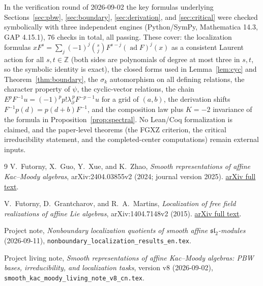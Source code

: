 \documentclass[11pt,a4paper]{article}
\newcommand{\Z}{\mathbb Z}
\newcommand{\ad}{\operatorname{ad}}
\theoremstyle{plainupright}
\begin{document}
In the verification round of 2026-09-02 the key formulas underlying
Sections~\ref{sec:pbw}, \ref{sec:boundary}, \ref{sec:derivation}, and
\ref{sec:critical} were checked symbolically with three independent engines
(Python/SymPy, Mathematica 14.3, GAP 4.15.1), 76 checks in total, all
passing. These cover: the localization formulas \(xF^s=\sum_j(-1)^j\binom{s}{j}F^{s-j}(\ad F)^j(x)\)
as a consistent Laurent action for all \(s,t\in\Z\) (both sides are
polynomials of degree at most three in \(s,t\), so the symbolic identity is
exact), the closed forms used in Lemma~\ref{lem:cyc} and
Theorem~\ref{thm:boundary}, the \(\sigma_k\) automorphism on all defining
relations, the character property of \(\psi\), the cyclic-vector relations,
the chain \(E^pF^{-1}u=(-1)^pp!\lambda_\partial^{\,p}F^{-p-1}u\) for a grid
of \((a,b)\), the derivation shifts \(F^{-1}p(d)=p(d+b)F^{-1}\), and the
composition law plus \(K=-2\) invariance of the formula in
Proposition~\ref{prop:spectral}. No Lean/Coq formalization is claimed, and
the paper-level theorems (the FGXZ criterion, the critical irreducibility
statement, and the completed-center computations) remain external inputs.

\begingroup
\raggedright
\begin{thebibliography}{9}
V.~Futorny, X.~Guo, Y.~Xue, and K.~Zhao,
\emph{Smooth representations of affine Kac--Moody algebras},
arXiv:2404.03855v2 (2024; journal version 2025).
\href{https://arxiv.org/html/2404.03855v2}{arXiv full text}.

V.~Futorny, D.~Grantcharov, and R.~A.~Martins,
\emph{Localization of free field realizations of affine Lie algebras},
arXiv:1404.7148v2 (2015).
\href{https://arxiv.org/html/1404.7148v2}{arXiv full text}.

Project note, \emph{Nonboundary localization quotients of smooth affine
\(\mathfrak{sl}_2\)-modules} (2026-09-11),
\texttt{nonboundary\_localization\_results\_en.tex}.

Project living note, \emph{Smooth representations of affine Kac--Moody
algebras: PBW bases, irreducibility, and localization tasks},
version v8 (2026-09-02),
\texttt{smooth\_kac\_moody\_living\_note\_v8\_cn.tex}.
\end{thebibliography}
\endgroup
\end{document}
